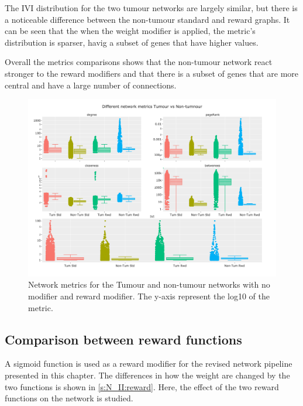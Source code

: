 The IVI distribution for the two tumour networks are largely similar, but there is a noticeable difference between the non-tumour standard and reward graphs. It can be seen that the when the weight modifier is applied, the metric's distribution is sparser, havig a subset of genes that have higher values.

Overall the metrics comparisons shows that the non-tumour network react stronger to the reward modifiers and that there is a subset of genes that are more central and have a large number of connections.

\begin{figure}[!htb]    
    \centering
    \includegraphics[width=1.0\textwidth,height=0.7\textheight,keepaspectratio]{Sections/Network_II/validation/network_comparison.png}
    \caption{Network metrics for the Tumour and non-tumour networks with no modifier and reward modifier. The y-axis represent the log10 of the metric. }
    \label{fig:N_II:net_metrics_comp}
\end{figure}


\subsection{Comparison between reward functions} \label{s:N_II:reward_comp}



A sigmoid function is used as a reward modifier for the revised network pipeline presented in this chapter. The differences in how the weight are changed by the two functions is shown in \cref{s:N_II:reward}. Here, the effect of the two reward functions on the network is studied.

